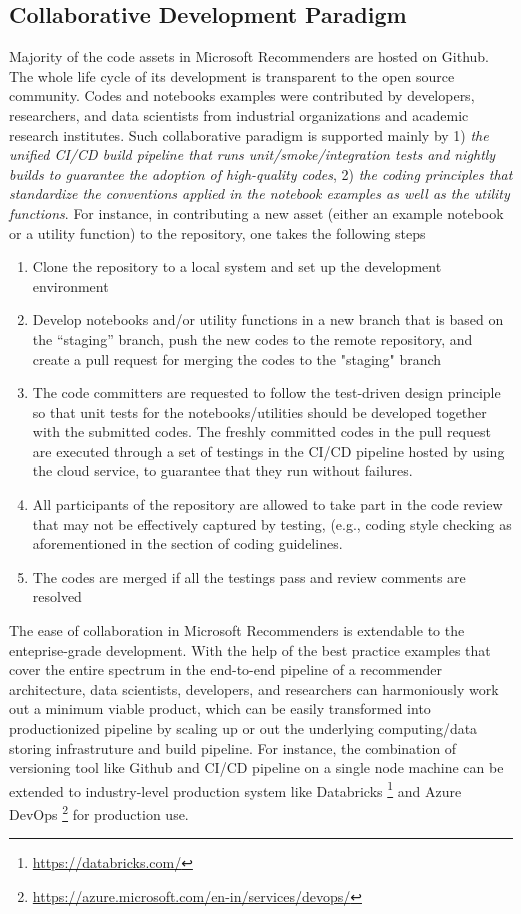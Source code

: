 \subsection{Collaborative Development Paradigm} %
Majority of the code assets in Microsoft Recommenders are hosted on Github. The whole life cycle of its development is transparent to the open source community. Codes and notebooks examples were contributed by developers, researchers, and data scientists from industrial organizations and academic research institutes. Such collaborative paradigm is supported mainly by 1) \textit{the unified CI/CD build pipeline that runs unit/smoke/integration tests and nightly builds to guarantee the adoption of high-quality codes}, 2) \textit{the coding principles that standardize the conventions applied in the notebook examples as well as the utility functions}. For instance, in contributing a new asset (either an example notebook or a utility function) to the repository, one takes the following steps
\begin{enumerate}
    \item Clone the repository to a local system and set up the development environment
    \item Develop notebooks and/or utility functions in a new branch that is based on the ``staging'' branch, push the new codes to the remote repository, and create a pull request for merging the codes to the "staging" branch
    \item The code committers are requested to follow the test-driven design principle so that unit tests for the notebooks/utilities should be developed together with the submitted codes. The freshly committed codes in the pull request are executed through a set of testings in the CI/CD pipeline hosted by using the cloud service, to guarantee that they run without failures.
    \item All participants of the repository are allowed to take part in the code review that may not be effectively captured by testing, (e.g., coding style checking as aforementioned in the section of coding guidelines.  
    \item The codes are merged if all the testings pass and review comments are resolved
\end{enumerate}

The ease of collaboration in Microsoft Recommenders is extendable to the enteprise-grade development. With the help of the best practice examples that cover the entire spectrum in the end-to-end pipeline of a recommender architecture, data scientists, developers, and researchers can harmoniously work out a minimum viable product, which can be easily transformed into productionized pipeline by scaling up or out the underlying computing/data storing infrastruture and build pipeline. For instance, the combination of versioning tool like Github and CI/CD pipeline on a single node machine can be extended to industry-level production system like Databricks \footnote{\url{https://databricks.com/}} and Azure DevOps \footnote{\url{https://azure.microsoft.com/en-in/services/devops/}} for production use.